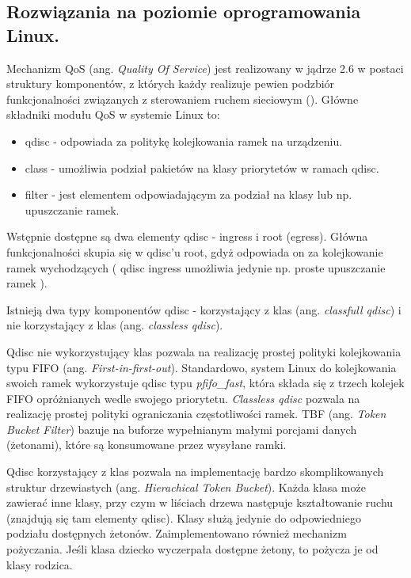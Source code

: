 \subsection{Rozwiązania na poziomie oprogramowania Linux.}

Mechanizm QoS (ang. \emph{Quality Of Service}) jest realizowany w jądrze 2.6 w postaci struktury komponentów, z których każdy realizuje pewien podzbiór funkcjonalności związanych z sterowaniem ruchem sieciowym (\cite{pub:QoS}). Główne składniki modułu QoS w systemie Linux to:

\begin{itemize}
\item qdisc - odpowiada za politykę kolejkowania ramek na urządzeniu.
\item class - umożliwia podział pakietów na klasy priorytetów w ramach qdisc.
\item filter - jest elementem odpowiadającym za podział na klasy lub np. upuszczanie ramek.
\end{itemize}

Wstępnie dostępne są dwa elementy qdisc - ingress i root (egress). Główna funkcjonalności skupia się w qdisc'u root, gdyż odpowiada on za kolejkowanie ramek wychodzących ( qdisc ingress umożliwia jedynie np. proste upuszczanie ramek ).

Istnieją dwa typy komponentów qdisc - korzystający z klas (ang. \emph{classfull qdisc}) i nie korzystający z klas (ang. \emph{classless qdisc}). 

Qdisc nie wykorzystujący klas pozwala na realizację prostej polityki kolejkowania typu FIFO (ang. \emph{First-in-first-out}). Standardowo, system Linux do kolejkowania swoich ramek wykorzystuje qdisc typu \emph{pfifo\_fast}, która składa się z trzech kolejek FIFO opróżnianych wedle swojego priorytetu. \emph{Classless qdisc} pozwala na realizację prostej polityki ograniczania częstotliwości ramek. TBF (ang. \emph{Token Bucket Filter}) bazuje na buforze wypełnianym małymi porcjami danych (żetonami), które są konsumowane przez wysyłane ramki.

Qdisc korzystający z klas pozwala na implementację bardzo skomplikowanych struktur drzewiastych (ang. \emph{Hierachical Token Bucket}). Każda klasa może zawierać inne klasy, przy czym w liściach drzewa następuje kształtowanie ruchu (znajdują się tam elementy qdisc). Klasy służą jedynie do odpowiedniego podziału dostępnych żetonów. Zaimplementowano również mechanizm pożyczania. Jeśli klasa dziecko wyczerpała dostępne żetony, to pożycza je od klasy rodzica.

